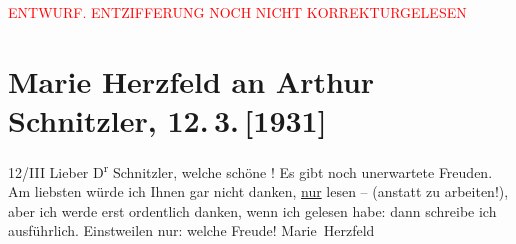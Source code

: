 
\begin{center}
            \textcolor{red}{ENTWURF. ENTZIFFERUNG NOCH NICHT KORREKTURGELESEN}
                      \end{center}
            
               \section[Marie Herzfeld an Arthur Schnitzler, 12. 3. {[}1931{]}]{ Marie Herzfeld an Arthur Schnitzler, 12. 3. {[}1931{]}}\nopagebreak{}\rehead{ }\begin{ledgroupsized}[t]{13cm}\normalsize\beginnumbering{} \toendnotes[C]{\smallbreak\pagebreak[2]} 
\toendnotes[C]{\smallbreak}\pstart
           \centering{}{\pb}12/III\pend
           \pstart
           Lieber D\textsuperscript{r} Schnitzler, welche schöne
                  \label{K_L02596-1v}\label{K_L02596-1h}! Es gibt noch
               unerwartete Freuden. Am liebsten würde ich Ihnen gar nicht danken, \uline{nur} lesen – (anstatt zu arbeiten!), aber ich werde
               erst {\pb}ordentlich danken, wenn ich gelesen habe: dann
               schreibe ich ausführlich. Einstweilen nur: welche Freude! \pend
           \pstart \spacefill\mbox{Marie Herzfeld}\pend{}\endnumbering{}\end{ledgroupsized}  \newcommand{\dateiname}{L02596}\newcommand{\titel}{Marie Herzfeld an Arthur Schnitzler, 12. 3. [1931]}\newcommand{\editorInnen}{Martin Anton Müller und Laura Untner}
      